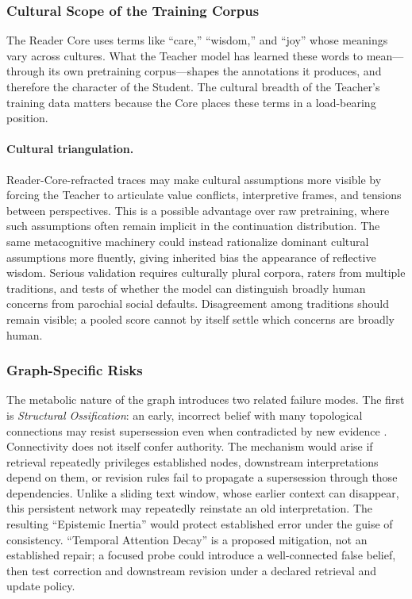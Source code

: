 \subsubsection{Cultural Scope of the Training Corpus}\label{sec:weird-wisdom}

The Reader Core uses terms like ``care,'' ``wisdom,'' and ``joy'' whose meanings vary across cultures. What the Teacher model has learned these words to mean---through its own pretraining corpus---shapes the annotations it produces, and therefore the character of the Student. The cultural breadth of the Teacher's training data matters because the Core places these terms in a load-bearing position.

\paragraph{Cultural triangulation.} Reader-Core-refracted traces may make cultural assumptions more visible by forcing the Teacher to articulate value conflicts, interpretive frames, and tensions between perspectives. This is a possible advantage over raw pretraining, where such assumptions often remain implicit in the continuation distribution. The same metacognitive machinery could instead rationalize dominant cultural assumptions more fluently, giving inherited bias the appearance of reflective wisdom. Serious validation requires culturally plural corpora, raters from multiple traditions, and tests of whether the model can distinguish broadly human concerns from parochial social defaults. Disagreement among traditions should remain visible; a pooled score cannot by itself settle which concerns are broadly human.

\subsubsection{Graph-Specific Risks}

The metabolic nature of the graph introduces two related failure modes. The first is \emph{Structural Ossification}: an early, incorrect belief with many topological connections may resist supersession even when contradicted by new evidence \cite{westerberg2026understanding}. Connectivity does not itself confer authority. The mechanism would arise if retrieval repeatedly privileges established nodes, downstream interpretations depend on them, or revision rules fail to propagate a supersession through those dependencies. Unlike a sliding text window, whose earlier context can disappear, this persistent network may repeatedly reinstate an old interpretation. The resulting ``Epistemic Inertia'' would protect established error under the guise of consistency. ``Temporal Attention Decay'' is a proposed mitigation, not an established repair; a focused probe could introduce a well-connected false belief, then test correction and downstream revision under a declared retrieval and update policy.

